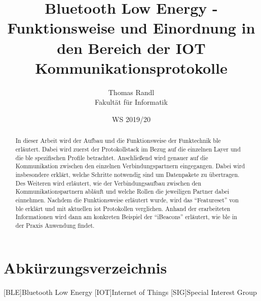 \documentclass[twoside=true, %
    DIV=15
    ,%
    BCOR=15mm, %
    headinclude=true,
    footinclude=false,
    pagesize,%
    fontsize=11pt,%
    paper=a4,%
    numbers=noenddot
  ]{scrartcl}
\begin{document}
\def\figdir{figures}
\def\tabledir{tables}

\titlehead{
\raggedleft
\texttt{[image: \\figdir/logo-th-rosenheim-2019\_master\_quer\_2c.eps]}
}

\title{
\vspace*{0cm}
Bluetooth Low Energy - Funktionsweise und Einordnung in den Bereich der IOT Kommunikationsprotokolle
}

\author{
Thomas Randl\\
Fakultät für Informatik}

\date{WS 2019/20}

\maketitle

\begin{abstract}
In dieser Arbeit wird der Aufbau und die Funktionsweise der Funktechnik \ac{ble} erläutert. Dabei wird zuerst der Protokollstack im Bezug auf die einzelnen Layer und die \ac{ble} spezifischen Profile betrachtet. Anschließend wird genauer auf die Kommunikation zwischen den einzelnen Verbindungspartnern eingegangen. Dabei wird insbesondere erklärt, welche Schritte notwendig sind um Datenpakete zu übertragen. Des Weiteren wird erläutert, wie der Verbindungsaufbau zwischen den Kommunikationspartnern abläuft und welche Rollen die jeweiligen Partner dabei einnehmen. Nachdem die Funktionsweise erläutert wurde, wird das "`Featureset"' von \ac{ble} erklärt und mit aktuellen \ac{iot} Protokollen verglichen. Anhand der erarbeiteten Informationen wird dann am konkreten Beispiel der "`iBeacons"' erläutert, wie \ac{ble} in der Praxis Anwendung findet.
\end{abstract}

\newpage

\tableofcontents

\newpage

\section*{Abkürzungsverzeichnis} %
\begin{acronym}[ECUAF]
	[BLE]{Bluetooth Low Energy}
	[IOT]{Internet of Things}
	[SIG]{Special Interest Group}
\end{acronym}









\appendix





\end{document}
